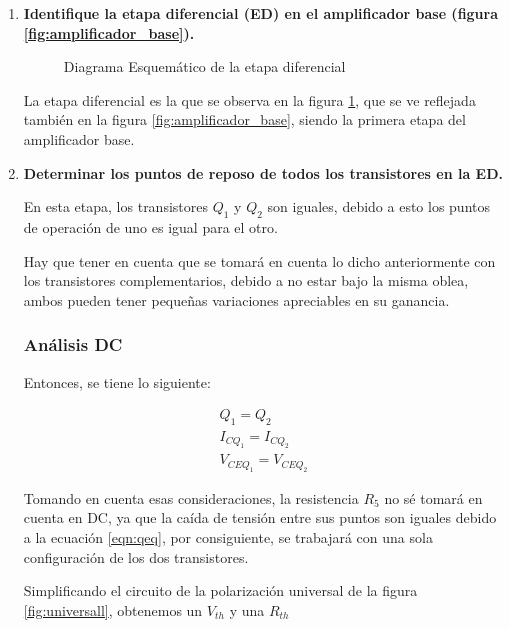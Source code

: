 \begin{enumerate}
  \item \textbf{Identifique la etapa diferencial (ED) en el amplificador base (figura \ref{fig:amplificador_base}).}

        \begin{figure}[H]
          \centering
          \caption{Diagrama Esquemático de la etapa  diferencial}
          \label{fig:amplificador_diferencial}
        \end{figure}

        La etapa diferencial es la que se observa en la figura \ref{fig:amplificador_diferencial}, que se ve reflejada también en la figura \ref{fig:amplificador_base}, siendo la primera etapa del amplificador base.

  \item \textbf{Determinar los puntos de reposo de todos los transistores en la ED.}

        En esta etapa, los transistores $Q_1$ y $Q_2$ son iguales, debido a esto los puntos de operación de uno es igual para el otro.

        Hay que tener en cuenta que se tomará en cuenta lo dicho anteriormente con los transistores complementarios, debido a no estar bajo la misma oblea, ambos pueden tener pequeñas variaciones apreciables en su ganancia.

        \subsubsection{Análisis DC}

        Entonces, se tiene lo siguiente:

        \begin{align}
          Q_1=Q_2 \label{eqn:qeq} \\[0.2cm]
          I_{CQ_1}=I_{CQ_2}       \\[0.2cm]
          V_{CEQ_1}=V_{CEQ_2}
        \end{align}

        Tomando en cuenta esas consideraciones, la resistencia $R_5$ no sé tomará en cuenta en DC, ya que la caída de tensión entre sus puntos son iguales debido a la ecuación \ref{eqn:qeq}, por consiguiente, se trabajará con una sola configuración de los dos transistores.

        Simplificando el circuito de la polarización universal de la figura \ref{fig:universall}, obtenemos un $V_{th}$ y una $R_{th}$


\end{enumerate}
